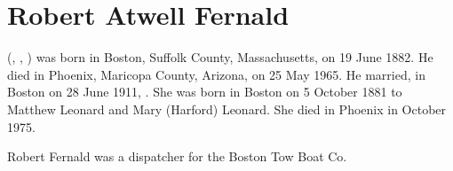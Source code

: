 \section{Robert Atwell Fernald}\label{per:Robert4Fernald}

 (, , ) was born in Boston, Suffolk County, Massachusetts, on 19 June 1882.\cite{Robert4FernaldBirth} He died in Phoenix, Maricopa County, Arizona, on 25 May 1965.\cite{Robert4FernaldDeath:1} He married, in Boston on 28 June 1911, .\cite{Robert4FernaldMarriage:1} She was born in Boston on 5 October 1881\cite{AgnesLeonardBirth} to Matthew Leonard and Mary (Harford) Leonard.\cite{Robert4FernaldMarriage:2} She died in Phoenix in October 1975.\cite{AgnesLeonardDeath}

Robert Fernald was a dispatcher for the Boston Tow Boat Co.\cite{Robert4FernaldDeath:2}